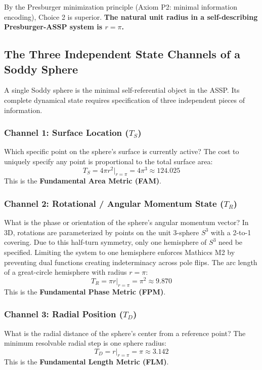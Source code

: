 \documentclass[11pt,a4paper]{article}
\begin{document}
By the Presburger minimization principle (Axiom P2: minimal information encoding),
Choice 2 is superior. \textbf{The natural unit radius in a self-describing
Presburger-ASSP system is $r = \pi$.}

\subsection{The Three Independent State Channels of a Soddy Sphere}

A single Soddy sphere is the minimal self-referential object in the ASSP. Its
complete dynamical state requires specification of three independent pieces of
information.

\subsubsection{Channel 1: Surface Location ($T_S$)}

Which specific point on the sphere's surface is currently active? The cost to
uniquely specify any point is proportional to the total surface area:
\[
  T_S = 4\pi r^2 \bigg|_{r=\pi} = 4\pi^3 \approx 124.025
\]
This is the \textbf{Fundamental Area Metric (FAM)}.

\subsubsection{Channel 2: Rotational / Angular Momentum State ($T_R$)}

What is the phase or orientation of the sphere's angular momentum vector? In 3D,
rotations are parameterized by points on the unit 3-sphere $S^3$ with a 2-to-1
covering. Due to this half-turn symmetry, only one hemisphere of $S^3$ need be
specified. Limiting the system to one hemisphere enforces Mathiccs M2 by preventing dual functions creating indeterminacy across pole flips. The arc length of a great-circle hemisphere with radius $r = \pi$:
\[
  T_R = \pi r \bigg|_{r=\pi} = \pi^2 \approx 9.870
\]
This is the \textbf{Fundamental Phase Metric (FPM)}.

\subsubsection{Channel 3: Radial Position ($T_D$)}

What is the radial distance of the sphere's center from a reference point? The
minimum resolvable radial step is one sphere radius:
\[
  T_D = r \bigg|_{r=\pi} = \pi \approx 3.142
\]
This is the \textbf{Fundamental Length Metric (FLM)}.
\end{document}
